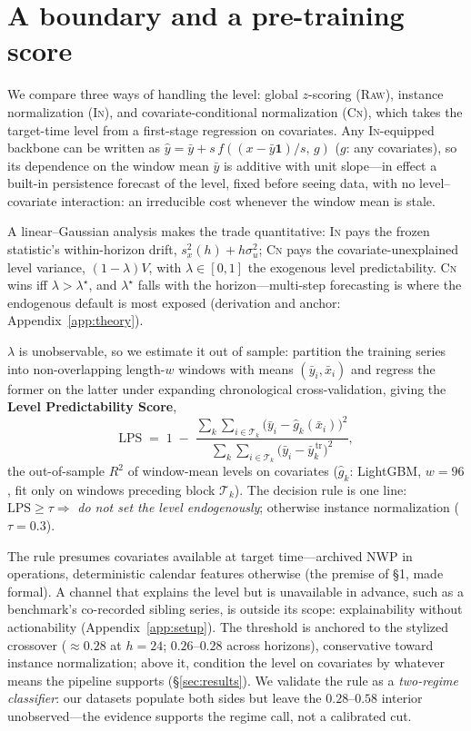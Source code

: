 \documentclass{article}
\newcommand{\lps}{\ensuremath{\mathrm{LPS}}}
\newcommand{\rawm}{\textsc{Raw}}
\newcommand{\inm}{\textsc{In}}
\newcommand{\cnm}{\textsc{Cn}}
\begin{document}
\section{A boundary and a pre-training score}\label{sec:score}

We compare three ways of handling the level: global $z$-scoring (\rawm),
instance normalization (\inm), and covariate-conditional normalization (\cnm),
which takes the target-time level from a first-stage regression on covariates.
Any \inm{}-equipped backbone can be written as
$\hat y = \bar y + s\, f\!\left((x-\bar y\mathbf 1)/s,\, g\right)$ ($g$: any
covariates), so its dependence on the window mean $\bar y$ is additive with
unit slope---in effect a built-in persistence forecast of the level, fixed
before seeing data, with no level--covariate interaction: an irreducible cost
whenever the window mean is stale.

A linear--Gaussian analysis makes the trade quantitative: \inm{} pays the
frozen statistic's within-horizon drift, $s_x^2(h)+h\sigma_u^2$; \cnm{} pays
the covariate-unexplained level variance, $(1-\lambda)V$, with
$\lambda\in[0,1]$ the exogenous level predictability. \cnm{} wins iff
$\lambda>\lambda^\star$, and $\lambda^\star$ falls with the
horizon---multi-step forecasting is where the endogenous default is most
exposed (derivation and anchor: Appendix~\ref{app:theory}).

$\lambda$ is unobservable, so we estimate it out of sample:
partition the training series into non-overlapping length-$w$ windows with means
$(\bar y_i, \bar x_i)$ and regress the former on the latter under expanding
chronological cross-validation, giving the \textbf{Level Predictability Score},
\begin{equation}\label{eq:lps}
\lps \;=\; 1 \;-\;
\frac{\sum_{k}\sum_{i\in\mathcal{T}_k}\bigl(\bar y_i-\hat g_k(\bar x_i)\bigr)^2}
     {\sum_{k}\sum_{i\in\mathcal{T}_k}\bigl(\bar y_i-\bar y^{\,\mathrm{tr}}_k\bigr)^2},
\end{equation}
the out-of-sample $R^2$ of window-mean levels on covariates ($\hat g_k$:
LightGBM, $w{=}96$, fit only on windows preceding block $\mathcal{T}_k$). The
decision rule is one line: $\lps \ge \tau \Rightarrow$ \emph{do not set the
level endogenously}; otherwise instance normalization ($\tau = 0.3$).

The rule presumes covariates available at target time---archived NWP in
operations, deterministic calendar features otherwise (the premise of \S1,
made formal). A channel that explains the level but is unavailable in advance,
such as a benchmark's co-recorded sibling series, is outside its scope:
explainability without actionability (Appendix~\ref{app:setup}). The threshold
is anchored to the stylized crossover ($\approx0.28$ at $h{=}24$;
$0.26$--$0.28$ across horizons), conservative toward instance normalization;
above it, condition the level on covariates by whatever means the pipeline
supports (\S\ref{sec:results}). We validate the rule as a \emph{two-regime
classifier}: our datasets populate both sides but leave the $0.28$--$0.58$
interior unobserved---the evidence supports the regime call, not a calibrated
cut.
\end{document}
